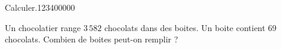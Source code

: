 \begin{pageAD}

\begin{ExoCad}{Calculer.}{1234}{0}{0}{0}{0}{0}

\begin{minipage}{0.6\linewidth}
Un chocolatier range $3\,582$ chocolats dans des boites. Un boite contient 69 chocolats. Combien de boites peut-on remplir ?  
\end{minipage}
\begin{minipage}{0.4\linewidth}
 \vspace{2cm}
\end{minipage}

\end{ExoCad}


 

 
\end{pageAD}

